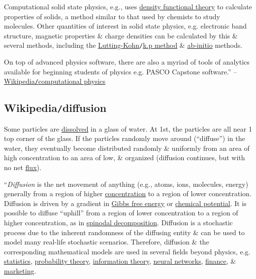 \documentclass{article}
\begin{document}
Computational solid state physics, e.g., uses \href{https://en.wikipedia.org/wiki/Density_functional_theory}{density functional theory} to calculate properties of solids, a method similar to that used by chemists to study molecules. Other quantities of interest in solid state physics, e.g. electronic band structure, magnetic properties \& charge densities can be calculated by this \& several methods, including the \href{https://en.wikipedia.org/wiki/Luttinger-Kohn_model}{Lutting-Kohn}{\tt/}\href{https://en.wikipedia.org/wiki/K.p_method}{k.p method} \& \href{https://en.wikipedia.org/wiki/Ab-initio}{ab-initio} methods.

On top of advanced physics software, there are also a myriad of tools of analytics available for beginning students of physics e.g. PASCO Capstone software.'' -- \href{https://en.wikipedia.org/wiki/Computational_physics}{Wikipedia{\tt/}computational physics}


\subsection{Wikipedia{\tt/}diffusion}
{\sf Some particles are \href{https://en.wikipedia.org/wiki/Dissolution_(chemistry)}{dissolved} in a glass of water. At 1st, the particles are all near 1 top corner of the glass. If the particles randomly move around (``diffuse'') in the water, they eventually become distributed randomly \& uniformly from an area of high concentration to an area of low, \& organized (diffusion continues, but with no net \href{https://en.wikipedia.org/wiki/Flux}{flux}).}

``{\it Diffusion} is the net movement of anything (e.g., atoms, ions, molecules, energy) generally from a region of higher \href{https://en.wikipedia.org/wiki/Concentration}{concentration} to a region of lower concentration. Diffusion is driven by a gradient in \href{https://en.wikipedia.org/wiki/Gibbs_free_energy}{Gibbs free energy} or \href{https://en.wikipedia.org/wiki/Chemical_potential}{chemical potential}. It is possible to diffuse ``uphill'' from a region of lower concentration to a region of higher concentration, as in \href{https://en.wikipedia.org/wiki/Spinodal_decomposition}{spinodal decomposition}. Diffusion is a stochastic process due to the inherent randomness of the diffusing entity \& can be used to model many real-life stochastic scenarios. Therefore, diffusion \& the corresponding mathematical models are used in several fields beyond physics, e.g. \href{https://en.wikipedia.org/wiki/Statistics}{statistics}, \href{https://en.wikipedia.org/wiki/Probability_theory}{probability theory}, \href{https://en.wikipedia.org/wiki/Information_theory}{information theory}, \href{https://en.wikipedia.org/wiki/Neural_networks}{neural networks}, \href{https://en.wikipedia.org/wiki/Finance}{finance}, \& \href{https://en.wikipedia.org/wiki/Marketing}{marketing}.
\end{document}
